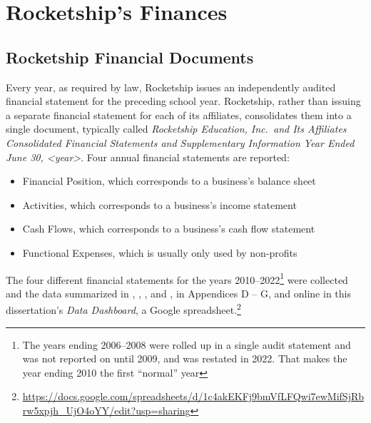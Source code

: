 \section{Rocketship's Finances}
\label{sec:rocketship_finance}\indent%

\subsection{Rocketship Financial Documents}%
\label{sec:rocketship-financial-docs}\indent%

Every year, as required by law, Rocketship issues an independently audited financial statement for the preceding school year. Rocketship, rather than issuing a separate financial statement for each of its affiliates, consolidates them into a single document, typically called \textit{Rocketship Education, Inc.\ and Its Affiliates Consolidated Financial Statements and Supplementary Information Year Ended June 30, <year>}. Four annual financial statements are reported:
\begin{itemize}
  \item Financial Position, which corresponds to a business's balance sheet
  \item Activities, which corresponds to a business's income statement
  \item Cash Flows, which corresponds to a business's cash flow statement
  \item Functional Expenses, which is usually only used by non-profits
\end{itemize}

The four different financial statements for the years 2010–2022\footnote{The years ending 2006–2008 were rolled up in a single audit statement and was not reported on until 2009, and was restated in 2022. That makes the year ending 2010 the first ``normal'' year} were collected and the data summarized in , , , and , in Appendices D – G, and online in this dissertation's \textit{Data Dashboard}, a Google spreadsheet.\footnote{\url{https://docs.google.com/spreadsheets/d/1c4akEKFj9bmVfLFQwi7ewMifSjRbrw5xpjh_UjO4oYY/edit?usp=sharing}}

